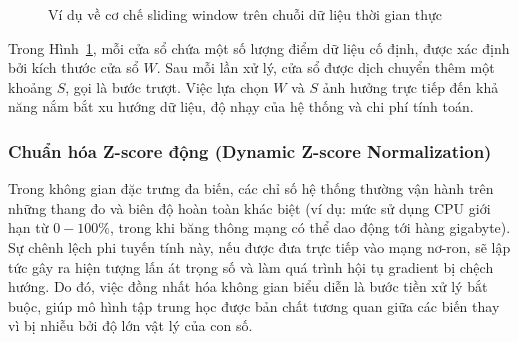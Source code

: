     \begin{figure}
    \centering
    \caption{Ví dụ về cơ chế sliding window trên chuỗi dữ liệu thời gian thực}
    \label{fig:sliding-window}
\end{figure}
    Trong Hình~\ref{fig:sliding-window}, mỗi cửa sổ chứa một số lượng điểm dữ liệu cố định, được xác định bởi kích thước cửa sổ $W$. Sau mỗi lần xử lý, cửa sổ được dịch chuyển thêm một khoảng $S$, gọi là bước trượt. Việc lựa chọn $W$ và $S$ ảnh hưởng trực tiếp đến khả năng nắm bắt xu hướng dữ liệu, độ nhạy của hệ thống và chi phí tính toán.
    \subsubsection*{Chuẩn hóa Z-score động (Dynamic Z-score Normalization)}

    Trong không gian đặc trưng đa biến, các chỉ số hệ thống thường vận hành trên những thang đo và biên độ hoàn toàn khác biệt (ví dụ: mức sử dụng CPU giới hạn từ $0-100\%$, trong khi băng thông mạng có thể dao động tới hàng gigabyte). Sự chênh lệch phi tuyến tính này, nếu được đưa trực tiếp vào mạng nơ-ron, sẽ lập tức gây ra hiện tượng lấn át trọng số và làm quá trình hội tụ gradient bị chệch hướng. Do đó, việc đồng nhất hóa không gian biểu diễn là bước tiền xử lý bắt buộc, giúp mô hình tập trung học được bản chất tương quan giữa các biến thay vì bị nhiễu bởi độ lớn vật lý của con số.

